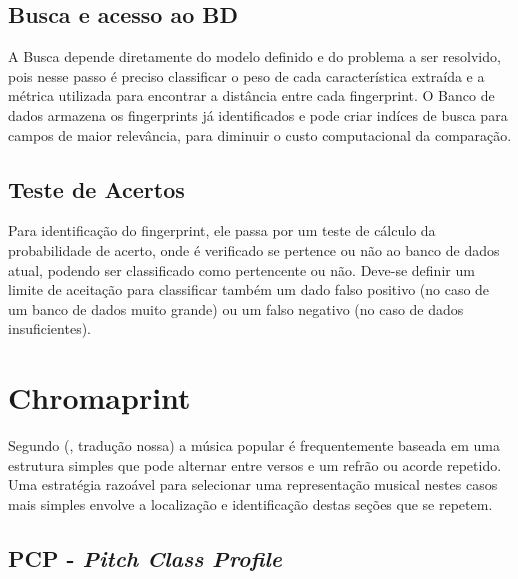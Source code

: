 \subsection{Busca e acesso ao BD}
\label{ss.buscabd}

A Busca depende diretamente do modelo definido e do problema a ser resolvido, pois nesse passo é preciso classificar o peso de cada característica extraída e a métrica utilizada para encontrar a distância entre cada fingerprint. O Banco de dados armazena os fingerprints já identificados e pode criar indíces de busca para campos de maior relevância, para diminuir o custo computacional da comparação.

\subsection{Teste de Acertos}
\label{ss.testeacertos}

Para identificação do fingerprint, ele passa por um teste de cálculo da probabilidade de acerto, onde é verificado se pertence ou não ao banco de dados atual, podendo ser classificado como pertencente ou não. Deve-se definir um limite de aceitação para classificar também um dado falso positivo (no caso de um banco de dados muito grande) ou um falso negativo (no caso de dados insuficientes).


\section{Chromaprint}
\label{s.chromaprint}

Segundo  (\citeyear{chromaprint}, tradução nossa) a música popular é frequentemente baseada em uma estrutura simples que pode alternar entre versos e um refrão ou acorde repetido. Uma estratégia razoável para selecionar uma representação musical nestes casos mais simples envolve a localização e identificação destas seções que se repetem.

\subsection{PCP - \emph{Pitch Class Profile} }
\label{ss.pcp}

